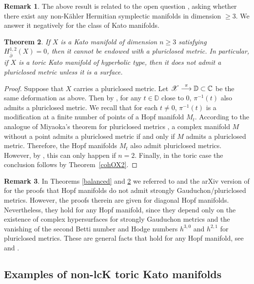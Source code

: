 \documentclass[JEP,XML,SOM,Unicode,NoFloatCountersInSection]{cedram}
\let\mathcal\mathscr
\newtheorem{theorem}{Theorem}[section]
\theoremstyle{definition}
\newtheorem{remark}[theorem]{Remark}
\newcommand{\To}[1]{\mathchoice{\xrightarrow{\textstyle\kern4pt#1\kern3pt}}{\stackrel{#1}{\longrightarrow}}{}{}}
\newcommand{\DD}{\mathbb{D}}
\newcommand{\Ka}{Kähler\xspace}
\begin{document}
\begin{remark}
The above result is related to the open question \cite[Quest.\,1.7]{st}, asking whether there exist any non-\Ka Hermitian symplectic manifolds in dimension $\geq 3$. We answer it negatively for the class of Kato manifolds.
\end{remark}

\begin{theorem}\label{pluri}
If $X$ is a Kato manifold of dimension $n\geq 3$ satisfying $H^{1, 2}_{\overline{\partial}}(X)=0$, then it cannot be endowed with a pluriclosed metric. In particular, if $X$ is a toric Kato manifold of hyperbolic type, then it does not admit a pluriclosed metric unless it is a surface.
\end{theorem}
\begin{proof}
Suppose that $X$ carries a pluriclosed metric. Let $\mathcal{X} \To{\pi} \mathbb{D} \subset \mathbb{C}$ be the same deformation as above. Then by \cite[Th.\,8.5 (arXiv version)]{c}, for any $t \in\DD$ close to $0$, $\pi^{-1}(t)$ also admits a pluriclosed metric. We recall that for each $t\neq 0$, $\pi^{-1}(t)$ is a modification at a finite number of points of a Hopf manifold $M_t$. According to the analogue of Miyaoka's theorem for pluriclosed metrics \cite[Th.\,4.3]{ft}, a complex manifold $M$ without a point admits a pluriclosed metric if and only if $M$ admits a pluriclosed metric. Therefore, the Hopf manifolds $M_t$ also admit pluriclosed metrics. However, by \cite[Ex.\,5.17, Th.\,5.16 (arXiv version)]{c}, this can only happen if $n=2$. Finally, in the toric case the conclusion follows by Theorem~\ref{cohOX2}.
\end{proof}

\begin{remark} In Theorems \ref{balanced} and \ref{pluri} we referred to \cite{P14} and the arXiv version of \cite{c} for the proofs that Hopf manifolds do not admit strongly Gauduchon/pluriclosed metrics. However, the proofs therein are given for diagonal Hopf manifolds. Nevertheless, they hold for any Hopf manifold, since they depend only on the existence of complex hypersurfaces for strongly Gauduchon metrics and the vanishing of the second Betti number and Hodge numbers $h^{3, 0}$ and $h^{2,1}$ for pluriclosed metrics. These are general facts that hold for any Hopf manifold, see \cite[\S 2]{kato79} and \cite[Th.\,3]{mall91}.
\end{remark}

\subsection*{Examples of non-lcK toric Kato manifolds}
\end{document}

